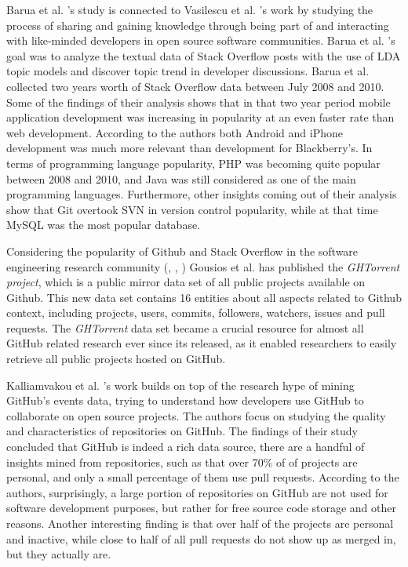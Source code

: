         Barua et al. \cite{barua2014developers}'s study is connected to Vasilescu et al. \cite{vasilescu2014social}'s work by studying the process of sharing and gaining knowledge through being part of and interacting with like-minded developers in open source software communities. Barua et al. \cite{barua2014developers}'s goal was to analyze the textual data of Stack Overflow posts with the use of LDA topic models and discover topic trend in developer discussions. Barua et al. collected two years worth of Stack Overflow data between July 2008 and 2010. Some of the findings of their analysis shows that in that two year period mobile application development was increasing in popularity at an even faster rate than web development. According to the authors both Android and iPhone development was much more relevant than development for Blackberry's. In terms of programming language popularity, PHP was becoming quite popular between 2008 and 2010, and  Java was still considered as one of the main programming languages. Furthermore, other insights coming out of their analysis show that Git overtook SVN in version control popularity, while at that time MySQL was the most popular database.
        
        Considering the popularity of Github and Stack Overflow in the software engineering research community (\cite{vasilescu2013stackoverflow}, \cite{badashian2014involvement}, \cite{lee2017github}) Gousios et al. \cite{gousios2013ghtorent} has published the \emph{GHTorrent project}, which is a public mirror data set of all public projects available on Github. This new data set contains 16 entities about all aspects related to Github context, including projects, users, commits, followers, watchers, issues and pull requests. The \emph{GHTorrent} data set became a crucial resource for almost all GitHub related research ever since its released, as it enabled researchers to easily retrieve all public projects hosted on GitHub. 
        
        Kalliamvakou et al. \cite{kalliamvakou2014promises}'s work builds on top of the research hype of mining GitHub's events data, trying to understand how developers use GitHub to collaborate on open source projects. The authors focus on studying the quality and characteristics of repositories on GitHub. The findings of their study concluded that GitHub is indeed a rich data source, there are a handful of insights mined from repositories, such as that over 70\% of of projects are personal, and only a small percentage of them use pull requests. According to the authors, surprisingly, a large portion of repositories on GitHub are not used for software development purposes, but rather for free source code storage and other reasons. Another interesting finding is that over half of the projects are personal and inactive, while close to half of all pull requests do not show up as merged in, but they actually are.
        
